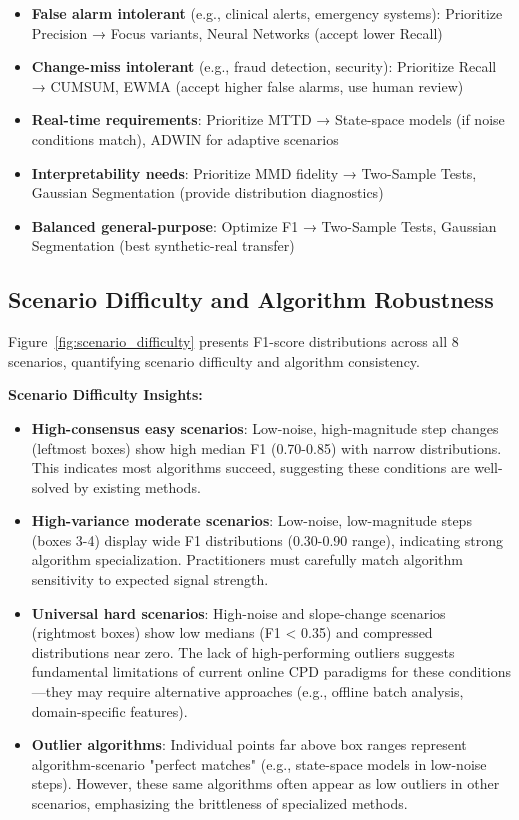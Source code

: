 \begin{itemize}
    \item \textbf{False alarm intolerant} (e.g., clinical alerts, emergency systems): Prioritize Precision → Focus variants, Neural Networks (accept lower Recall)
    \item \textbf{Change-miss intolerant} (e.g., fraud detection, security): Prioritize Recall → CUMSUM, EWMA (accept higher false alarms, use human review)
    \item \textbf{Real-time requirements}: Prioritize MTTD → State-space models (if noise conditions match), ADWIN for adaptive scenarios
    \item \textbf{Interpretability needs}: Prioritize MMD fidelity → Two-Sample Tests, Gaussian Segmentation (provide distribution diagnostics)
    \item \textbf{Balanced general-purpose}: Optimize F1 → Two-Sample Tests, Gaussian Segmentation (best synthetic-real transfer)
\end{itemize}


\subsection{Scenario Difficulty and Algorithm Robustness}

Figure~\ref{fig:scenario_difficulty} presents F1-score distributions across all 8 scenarios, quantifying scenario difficulty and algorithm consistency.

\textbf{Scenario Difficulty Insights:}

\begin{itemize}
    \item \textbf{High-consensus easy scenarios}: Low-noise, high-magnitude step changes (leftmost boxes) show high median F1 (0.70-0.85) with narrow distributions. This indicates most algorithms succeed, suggesting these conditions are well-solved by existing methods.
    
    \item \textbf{High-variance moderate scenarios}: Low-noise, low-magnitude steps (boxes 3-4) display wide F1 distributions (0.30-0.90 range), indicating strong algorithm specialization. Practitioners must carefully match algorithm sensitivity to expected signal strength.
    
    \item \textbf{Universal hard scenarios}: High-noise and slope-change scenarios (rightmost boxes) show low medians (F1 < 0.35) and compressed distributions near zero. The lack of high-performing outliers suggests fundamental limitations of current online CPD paradigms for these conditions—they may require alternative approaches (e.g., offline batch analysis, domain-specific features).
    
    \item \textbf{Outlier algorithms}: Individual points far above box ranges represent algorithm-scenario "perfect matches" (e.g., state-space models in low-noise steps). However, these same algorithms often appear as low outliers in other scenarios, emphasizing the brittleness of specialized methods.
\end{itemize}


